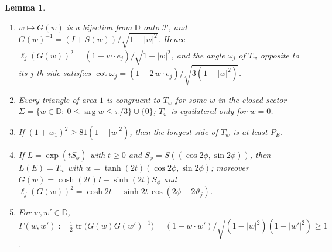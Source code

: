 \documentclass[11pt]{article}
\newtheorem{lemma}[theorem]{Lemma}
\theoremstyle{remark}
\newcommand{\cP}{\mathcal{P}}
\DeclareMathOperator{\tr}{tr}
\begin{document}
\begin{lemma}\label{p-lem:shape}
\begin{enumerate}
\item[\textup{(a)}] $w\mapsto G(w)$ is a bijection from $\mathbb D$ onto $\cP$, and
$G(w)^{-1}=(I+S(w))/\sqrt{1-|w|^2}$. Hence
$\ell_j(G(w))^2=(1+w\cdot e_j)/\sqrt{1-|w|^2}$, and the angle $\omega_j$ of $T_w$ opposite to its
$j$-th side satisfies $\cot\omega_j=(1-2\,w\cdot e_j)/\sqrt{3(1-|w|^2)}$.
\item[\textup{(b)}] Every triangle of area $1$ is congruent to $T_w$ for some $w$ in the closed
sector $\Sigma=\{w\in\mathbb D:\ 0\le\arg w\le\pi/3\}\cup\{0\}$; $T_w$ is equilateral only for $w=0$.
\item[\textup{(c)}] If $(1+w_1)^2\ge81(1-|w|^2)$, then the longest side of $T_w$ is at least $P_E$.
\item[\textup{(d)}] If $L=\exp(tS_\phi)$ with $t\ge0$ and
$S_\phi=S((\cos2\phi,\sin2\phi))$, then $L(E)=T_w$ with $w=\tanh(2t)(\cos2\phi,\sin2\phi)$;
moreover $G(w)=\cosh(2t)I-\sinh(2t)S_\phi$ and
$\ell_j(G(w))^2=\cosh2t+\sinh2t\,\cos(2\phi-2\vartheta_j)$.
\item[\textup{(e)}] For $w,w'\in\mathbb D$,
$\Gamma(w,w'):=\tfrac12\tr\bigl(G(w)G(w')^{-1}\bigr)=(1-w\cdot w')/\sqrt{(1-|w|^2)(1-|w'|^2)}\ge1$.
\end{enumerate}
\end{lemma}
\end{document}
